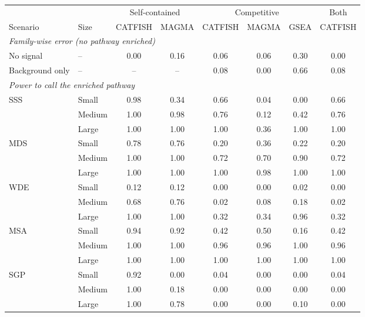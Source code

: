 \begin{tabular*}{\linewidth}{@{\extracolsep{\fill}}llcccccc}
\toprule
 & & \multicolumn{2}{c}{Self-contained} & \multicolumn{3}{c}{Competitive} & Both \\
\cmidrule(lr){3-4}\cmidrule(lr){5-7}\cmidrule(lr){8-8}
Scenario & Size & CATFISH & MAGMA & CATFISH & MAGMA & GSEA & CATFISH \\
\midrule
\multicolumn{8}{l}{\emph{Family-wise error (no pathway enriched)}} \\
No signal & -- & 0.00 & 0.16 & 0.06 & 0.06 & 0.30 & 0.00 \\
Background only & -- & -- & -- & 0.08 & 0.00 & 0.66 & 0.08 \\
\midrule
\multicolumn{8}{l}{\emph{Power to call the enriched pathway}} \\
SSS & Small & 0.98 & 0.34 & 0.66 & 0.04 & 0.00 & 0.66 \\
 & Medium & 1.00 & 0.98 & 0.76 & 0.12 & 0.42 & 0.76 \\
 & Large & 1.00 & 1.00 & 1.00 & 0.36 & 1.00 & 1.00 \\
MDS & Small & 0.78 & 0.76 & 0.20 & 0.36 & 0.22 & 0.20 \\
 & Medium & 1.00 & 1.00 & 0.72 & 0.70 & 0.90 & 0.72 \\
 & Large & 1.00 & 1.00 & 1.00 & 0.98 & 1.00 & 1.00 \\
WDE & Small & 0.12 & 0.12 & 0.00 & 0.00 & 0.02 & 0.00 \\
 & Medium & 0.68 & 0.76 & 0.02 & 0.08 & 0.18 & 0.02 \\
 & Large & 1.00 & 1.00 & 0.32 & 0.34 & 0.96 & 0.32 \\
MSA & Small & 0.94 & 0.92 & 0.42 & 0.50 & 0.16 & 0.42 \\
 & Medium & 1.00 & 1.00 & 0.96 & 0.96 & 1.00 & 0.96 \\
 & Large & 1.00 & 1.00 & 1.00 & 1.00 & 1.00 & 1.00 \\
SGP & Small & 0.92 & 0.00 & 0.04 & 0.00 & 0.00 & 0.04 \\
 & Medium & 1.00 & 0.18 & 0.00 & 0.00 & 0.00 & 0.00 \\
 & Large & 1.00 & 0.78 & 0.00 & 0.00 & 0.10 & 0.00 \\
\bottomrule
\end{tabular*}
